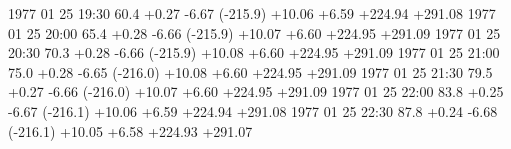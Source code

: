 \documentclass[11pt,noabs,nolof]{starlink}
\newenvironment{verysmall}{\begin{scriptsize}}{\end{scriptsize}}
\begin{document}
\begin{verysmall}
\begin{terminalv}
1977 01 25 19:30    60.4    +0.27     -6.67 (-215.9)     +10.06     +6.59     +224.94      +291.08
1977 01 25 20:00    65.4    +0.28     -6.66 (-215.9)     +10.07     +6.60     +224.95      +291.09
1977 01 25 20:30    70.3    +0.28     -6.66 (-215.9)     +10.08     +6.60     +224.95      +291.09
1977 01 25 21:00    75.0    +0.28     -6.65 (-216.0)     +10.08     +6.60     +224.95      +291.09
1977 01 25 21:30    79.5    +0.27     -6.66 (-216.0)     +10.07     +6.60     +224.95      +291.09
1977 01 25 22:00    83.8    +0.25     -6.67 (-216.1)     +10.06     +6.59     +224.94      +291.08
1977 01 25 22:30    87.8    +0.24     -6.68 (-216.1)     +10.05     +6.58     +224.93      +291.07
\end{terminalv}
\end{verysmall}
\end{document}
